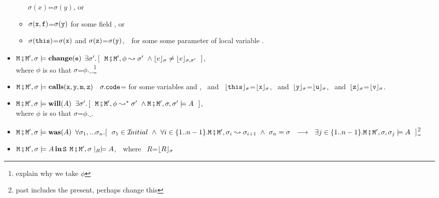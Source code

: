 \begin{definition}
\begin{itemize}
\begin{itemize}
$\sigma(x)$=$\sigma(y)$, or
\item
$\sigma({\mbox{\tt{x}}},{\mbox{\tt{f}}})$=$\sigma({\mbox{\tt{y}}})$  for some field ,  or
\item
$\sigma({\mbox{\tt{this}}})$=$\sigma({\mbox{\tt{x}}})$ and
  $\sigma({\mbox{\tt{z}}})$=$\sigma({\mbox{\tt{y}}})$,
  $\strut \hspace{0.1cm}$
for some some parameter of local variable .
 \end{itemize}
 \item
 ${\mbox{\tt{M}}}\fatsemi {\mbox{\tt{M}}}', \sigma \models   \mbox{\bf{change}}({\mbox{\tt{e}}})$  \IFF 
 $\exists \sigma'.\, [\ \ {\mbox{\tt{M}}}\fatsemi {\mbox{\tt{M}}}',\phi \leadsto \sigma' \ \wedge {\ensuremath{\lfloor{ {e}}\rfloor_{\sigma}}} \neq {\ensuremath{\lfloor{ {e}}\rfloor_{\sigma,\sigma'}}} \ \  ]$,\\
 where $\phi$ is so that $\sigma$=$\phi.\_$.\footnote{explain why we take $\phi$}
 \item
${\mbox{\tt{M}}}\fatsemi {\mbox{\tt{M}}}', \sigma \models  \mbox{\bf{calls}}({\mbox{\tt{x}}},{\mbox{\tt{y}}},{\mbox{\tt{m}}},{\mbox{\tt{z}}})$ \IFF \
 $\sigma.{\mbox{\tt{code}}}$= for some variables  and ,  \ and \  
${\lfloor{ {{\mbox{\tt{this}}}}}\rfloor_{\sigma}}$=${\lfloor{ {{\mbox{\tt{x}}}}}\rfloor_{\sigma}}$, \ and\ ${\lfloor{ {{\mbox{\tt{y}}}}}\rfloor_{\sigma}}$=${\lfloor{ {{\mbox{\tt{u}}}}}\rfloor_{\sigma}}$,
 \ and\ ${\lfloor{ {{\mbox{\tt{z}}}}}\rfloor_{\sigma}}$=${\lfloor{ {{\mbox{\tt{v}}}}}\rfloor_{\sigma}}$.
 \item
  ${\mbox{\tt{M}}}\fatsemi {\mbox{\tt{M}}}', \sigma \models  \mbox{\bf{will}}(A) $
  \IFF
  $\exists \sigma'.\, [\ \ {\mbox{\tt{M}}}\fatsemi {\mbox{\tt{M}}}',\phi \leadsto^* \sigma' \ \wedge {\mbox{\tt{M}}}\fatsemi {\mbox{\tt{M}}}',\sigma,\sigma' \models A \ \  ]$,\\
 where $\phi$ is so that $\sigma$=$\phi.\_$.

 \item
 ${\mbox{\tt{M}}}\fatsemi {\mbox{\tt{M}}}', \sigma \models  \mbox{\bf{was}}(A) $ \IFF 
 $\forall \sigma_1, ... \sigma_n. [\ \ \sigma_1\in \Initial{}\ \wedge \ 
 \forall i\in\{1..n-1\}. \M\mkpair \M', \sigma_{i} \leadsto  \sigma_{i+1} \ \wedge \ 
 \sigma_n=\sigma \ \ \longrightarrow \ \ \exists j\in\{1..n-1\}.
 \M\mkpair \M', \sigma, \sigma_j  \models \A\ \ 
 ]$\footnote{past includes the present, perhaps change this}
 
 \item
 ${\mbox{\tt{M}}}\fatsemi {\mbox{\tt{M}}}', \sigma \models A\,\mbox{\bf{in}}\, {\mbox{\tt{S}}}$
 \IFF
 ${\mbox{\tt{M}}}\fatsemi {\mbox{\tt{M}}}', \sigma\mid_R \models  A  $,\ \ where \ $R$=${\lfloor{ {R}}\rfloor_{\sigma}}$



\end{itemize}
\end{definition}
